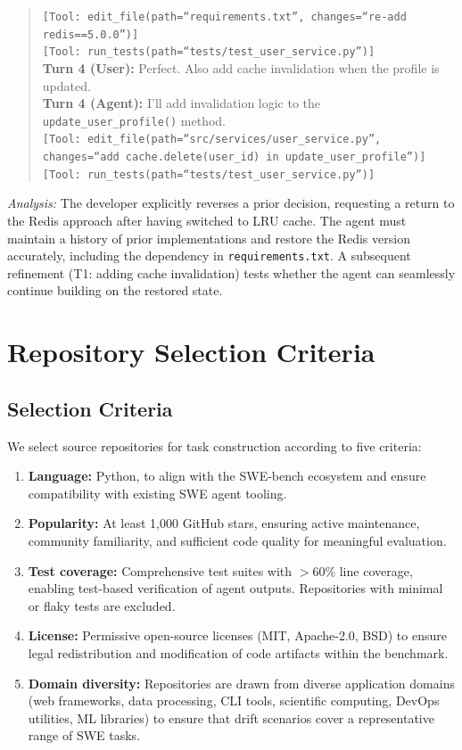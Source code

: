 \begin{quote}
\texttt{[Tool: edit\_file(path=``requirements.txt'', changes=``re-add redis==5.0.0'')]}\\
\texttt{[Tool: run\_tests(path=``tests/test\_user\_service.py'')]}\\[4pt]
\textbf{Turn 4 (User):} Perfect. Also add cache invalidation when the profile is updated.\\
\textbf{Turn 4 (Agent):} I'll add invalidation logic to the \texttt{update\_user\_profile()} method.\\
\texttt{[Tool: edit\_file(path=``src/services/user\_service.py'', changes=``add cache.delete(user\_id) in update\_user\_profile'')]}\\
\texttt{[Tool: run\_tests(path=``tests/test\_user\_service.py'')]}
\end{quote}

\noindent\textit{Analysis:} The developer explicitly reverses a prior decision, requesting a return to the Redis approach after having switched to LRU cache. The agent must maintain a history of prior implementations and restore the Redis version accurately, including the dependency in \texttt{requirements.txt}. A subsequent refinement (T1: adding cache invalidation) tests whether the agent can seamlessly continue building on the restored state.


\section{Repository Selection Criteria}
\label{app:repo-selection}

\subsection{Selection Criteria}

We select source repositories for \bench{} task construction according to five criteria:

\begin{enumerate}[leftmargin=*, itemsep=2pt]
    \item \textbf{Language:} Python, to align with the SWE-bench ecosystem and ensure compatibility with existing SWE agent tooling.
    \item \textbf{Popularity:} At least 1{,}000 GitHub stars, ensuring active maintenance, community familiarity, and sufficient code quality for meaningful evaluation.
    \item \textbf{Test coverage:} Comprehensive test suites with $>$60\% line coverage, enabling test-based verification of agent outputs. Repositories with minimal or flaky tests are excluded.
    \item \textbf{License:} Permissive open-source licenses (MIT, Apache-2.0, BSD) to ensure legal redistribution and modification of code artifacts within the benchmark.
    \item \textbf{Domain diversity:} Repositories are drawn from diverse application domains (web frameworks, data processing, CLI tools, scientific computing, DevOps utilities, ML libraries) to ensure that drift scenarios cover a representative range of SWE tasks.
\end{enumerate}

